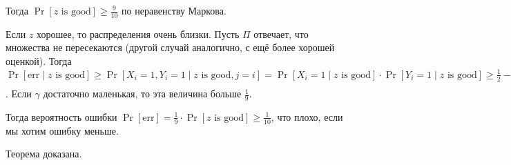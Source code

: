 Тогда $\Pr[z \text{ is good}] \geq \frac{9}{10}$ по неравенству Маркова.

Если $z$ хорошее, то распределения очень близки. Пусть $\Pi$ отвечает, что множества не пересекаются
(другой случай аналогично, с ещё более хорошей оценкой). Тогда $\Pr[\text{err} \mid z \text{ is good}]
\ge \Pr[X_i = 1, Y_i = 1 \mid z \text{ is good}, j = i] = \Pr[X_i = 1 \mid z \text{ is good}] \cdot
\Pr[Y_i = 1 \mid z \text{ is good}] \geq \frac{1}{2} - 10\sqrt{\frac{3}{4}\gamma}$. Если $\gamma$
достаточно маленькая, то эта величина больше $\frac{1}{9}$.

Тогда вероятность ошибки $\Pr[\text{err}] = \frac{1}{9} \cdot \Pr[z \text{ is good}] \ge \frac{1}{10}$,
что плохо, если мы хотим ошибку меньше.

Теорема доказана.
